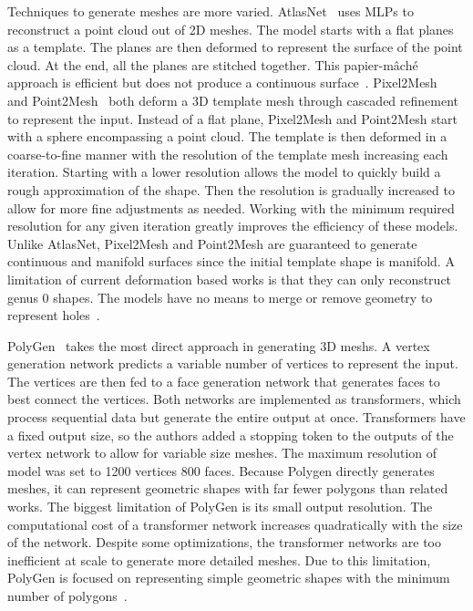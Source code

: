 Techniques to generate meshes are more varied. AtlasNet~\cite{Groueix2018} uses MLPs to reconstruct a point cloud out of 2D meshes. The model starts with a flat planes  as a template. The planes are then deformed to represent the surface of the point cloud. At the end, all the planes are stitched together. This papier-m\^{a}ch\'{e} approach is efficient but does not produce a continuous surface~\cite{Groueix2018}. Pixel2Mesh~\cite{Wang2018} and Point2Mesh~\cite{Hanocka2020} both deform a 3D template mesh through cascaded refinement to represent the input. Instead of a flat plane, Pixel2Mesh and Point2Mesh start with a sphere encompassing a point cloud. The template is then deformed in a coarse-to-fine manner with the resolution of the template mesh increasing each iteration. Starting with a lower resolution allows the model to quickly build a rough approximation of the shape. Then the resolution is gradually increased to allow for more fine adjustments as needed. Working with the minimum required resolution for any given iteration greatly improves the efficiency of these models. Unlike AtlasNet, Pixel2Mesh and Point2Mesh are guaranteed to generate continuous and manifold surfaces since the initial template shape is manifold. A limitation of current deformation based works is that they can only reconstruct genus 0 shapes. The models have no means to merge or remove geometry to represent holes~\cite{Wang2018, Hanocka2020}.

PolyGen~\cite{Nash2020} takes the most direct approach in generating 3D meshs. A vertex generation network predicts a variable number of vertices to represent the input. The vertices are then fed to a face generation network that generates faces to best connect the vertices. Both networks are implemented as transformers, which process sequential data but generate the entire output at once. Transformers have a fixed output size, so the authors added a stopping token to the outputs of the vertex network to allow for variable size meshes. The maximum resolution of model was set to 1200 vertices 800 faces. Because Polygen directly generates meshes, it can represent geometric shapes with far fewer polygons than related works. The biggest limitation of PolyGen is its small output resolution. The computational cost of a transformer network increases quadratically with the size of the network. Despite some optimizations, the transformer networks are too inefficient at scale to generate more detailed meshes. Due to this limitation, PolyGen is focused on representing simple geometric shapes with the minimum number of polygons~\cite{Nash2020}.


